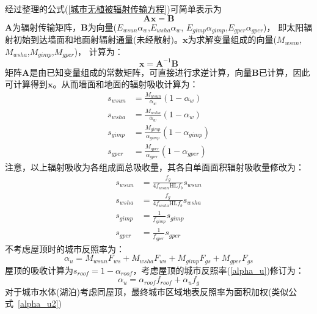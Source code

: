 经过整理的公式(\ref{城市无植被辐射传输方程})可简单表示为
\begin{equation}\label{mathbf_AX}
\mathbf{A x}=\mathbf{B}
\end{equation}
$\mathbf{A}$为辐射传输矩阵，$\mathbf{B}$为向量($E_{wsun}\alpha_w$,$E_{wsha}\alpha_w$,
$E_{gimp}\alpha_{gimp}$,$E_{gper}\alpha_{gper}$)，
即太阳辐射初始到达墙面和地面射辐射通量(未经散射)。$\mathbf{x}$为求解变量组成的向量(\allowbreak$M_{wsun}$,\allowbreak$M_{wsha}$,\allowbreak$M_{gimp}$,\allowbreak$M_{gper}$)，
计算为：
\begin{equation}\label{mathbf_X}
\mathbf{x}=\mathbf{A}^{-1} \mathbf{B}
\end{equation}
矩阵$\mathbf{A}$是由已知变量组成的常数矩阵，可直接进行求逆计算，向量$\mathbf{B}$已计算，因此可计算得到$\mathbf{x}$。从而墙面和地面的辐射吸收计算为：
\begin{equation}\label{s_wsun_wsha_gimp_gper_1}
\begin{aligned}s_{wsun} &=\frac{M_{wsun}}{\alpha_{w}}\left(1-\alpha_{w}\right) \\ 
    s_{wsha} &=\frac{M_{wsha}}{\alpha_{w}}\left(1-\alpha_{w}\right) \\
    s_{gimp} &=\frac{M_{gimp}}{\alpha_{gimp}}\left(1-\alpha_{gimp}\right) \\
    s_{gper} &=\frac{M_{gper}}{\alpha_{gper}}\left(1-\alpha_{gper}\right)\end{aligned}
\end{equation}
注意，以上辐射吸收为各组成面总吸收量，其各自单面面积辐射吸收量修改为：
\begin{equation}\label{s_wsun_wsha_gimp_gper_2}
\begin{aligned}s_{wsun} &=\frac{f_{g}}{4 f_{wsun} \mathrm{HL} f_{b}} s_{wsun} \\ 
    s_{wsha} &=\frac{f_{g}}{4 f_{wsha} \mathrm{HL} f_{b}} s_{wsha} \\ 
    s_{gimp} &=\frac{1}{f_{gimp}} s_{gimp} \\ 
    s_{gper} &=\frac{1}{f_{gper}} s_{gper}\end{aligned}
\end{equation}
不考虑屋顶时的城市反照率为：
\begin{equation}\label{alpha_u}
\alpha_{u}=M_{wsun} F_{ws}+M_{wsha} F_{ws}+M_{gimp} F_{gs}+M_{gper} F_{gs}
\end{equation}
屋顶的吸收计算为$s_{roof}=1-\alpha_{roof}$，考虑屋顶的城市反照率(\ref{alpha_u})修订为：
\begin{equation}\label{alpha_u2}
\alpha_{u}=\alpha_{{roof }} f_{roof}+\alpha_{u} f_{g}
\end{equation}
对于城市水体(湖泊)考虑同屋顶，最终城市区域地表反照率为面积加权(类似公式~\eqref{alpha_u2})

